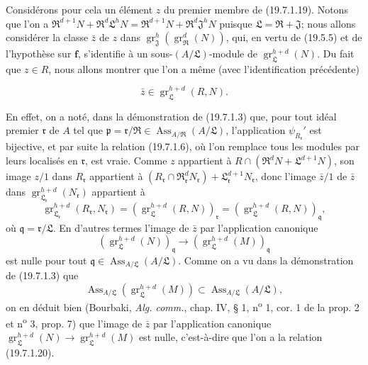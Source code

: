 Considérons pour cela un élément $z$ du premier membre de (19.7.1.19). Notons que l'on a $\mathfrak R^{d+1}N+\mathfrak R^d\mathfrak L^hN=\mathfrak R^{d+1}N+\mathfrak R^d\mathfrak J^hN$ puisque $\mathfrak L=\mathfrak R+\mathfrak J$; nous allons considérer la classe $\bar z$ de $z$ dans $\operatorname{gr}_{\mathfrak J}^h(\operatorname{gr}_{\mathfrak R}^d(N))$, qui, en vertu de (19.5.5) et de l'hypothèse sur $\mathbf f$, s'identifie à un sous-$(A/\mathfrak L)$-module de $\operatorname{gr}_{\mathfrak L}^{h+d}(N)$. Du fait que $z\in R$, nous allons montrer que l'on a même (avec l'identification précédente)
\begin{env}[19.7.1.20]
\label{IV.19.7.1.20}
\[
  \bar z\in\operatorname{gr}_{\mathfrak L}^{h+d}(R,N).
\]
\end{env}

En effet, on a noté, dans la démonstration de (19.7.1.3) que, pour tout idéal premier $\mathfrak r$ de $A$ tel que $\mathfrak p=\mathfrak r/\mathfrak R\in\operatorname{Ass}_{A/\mathfrak R}(A/\mathfrak L)$, l'application $\psi_{R_{\mathfrak r}}'$ est bijective, et par suite la relation (19.7.1.6), où l'on remplace tous les modules par leurs localisés en $\mathfrak r$, est vraie. Comme $z$ appartient à $R\cap(\mathfrak R^dN+\mathfrak L^{d+1}N)$, son image $z/1$ dans $R_{\mathfrak r}$ appartient à $(R_{\mathfrak r}\cap\mathfrak R_{\mathfrak r}^dN_{\mathfrak r})+\mathfrak L_{\mathfrak r}^{d+1}N_{\mathfrak r}$, donc l'image $\bar z/1$ de $\bar z$ dans $\operatorname{gr}_{\mathfrak L_{\mathfrak r}}^{h+d}(N_{\mathfrak r})$ appartient à
\[
  \operatorname{gr}_{\mathfrak L_{\mathfrak r}}^{h+d}(R_{\mathfrak r},N_{\mathfrak r})
  =(\operatorname{gr}_{\mathfrak L}^{h+d}(R,N))_{\mathfrak r}
  =(\operatorname{gr}_{\mathfrak L}^{h+d}(R,N))_{\mathfrak q},
\]
où $\mathfrak q=\mathfrak r/\mathfrak L$. En d'autres termes l'image de $\bar z$ par l'application canonique
\[
  (\operatorname{gr}_{\mathfrak L}^{h+d}(N))_{\mathfrak q}\longrightarrow(\operatorname{gr}_{\mathfrak L}^{h+d}(M))_{\mathfrak q}
\]
est nulle pour tout $\mathfrak q\in\operatorname{Ass}_{A/\mathfrak L}(A/\mathfrak L)$. Comme on a vu dans la démonstration de (19.7.1.3) que
\[
  \operatorname{Ass}_{A/\mathfrak L}(\operatorname{gr}_{\mathfrak L}^{h+d}(M))\subset\operatorname{Ass}_{A/\mathfrak L}(A/\mathfrak L),
\]
on en déduit bien (Bourbaki, \emph{Alg. comm.}, chap. IV, § 1, n\textsuperscript{o} 1, cor. 1 de la prop. 2 et n\textsuperscript{o} 3, prop. 7) que l'image de $\bar z$ par l'application canonique $\operatorname{gr}_{\mathfrak L}^{h+d}(N)\to\operatorname{gr}_{\mathfrak L}^{h+d}(M)$ est nulle, c'est-à-dire que l'on a la relation (19.7.1.20).

